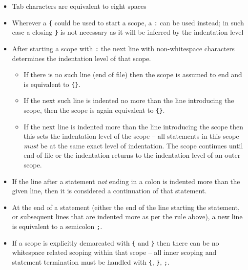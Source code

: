 \begin{itemize}
\item Tab characters are equivalent to eight spaces
\item Wherever a \verb!{! could be used to start a scope, a \verb!:! can be used instead; in such case a closing \verb!}! is not necessary as it will be inferred by the indentation level
\item After starting a scope with \verb!:! the next line with non-whitespace characters determines the indentation level of that scope.
\begin{itemize}
\item If there is no such line (end of file) then the scope is assumed to end and is equivalent to \verb!{}!.
\item If the next such line is indented no more than the line introducing the scope, then the scope is again equivalent to \verb!{}!.
\item If the next line is indented more than the line introducing the scope then this sets the indentation level of the scope -- all statements in this scope \emph{must} be at the same exact level of indentation. The scope continues until end of file or the indentation returns to the indentation level of an outer scope.
\end{itemize}
\item If the line after a statement \emph{not} ending in a colon is indented more than the given line, then it is considered a continuation of that statement.
\item At the end of a statement (either the end of the line starting the statement, or subsequent lines that are indented more as per the rule above), a new line is equivalent to a semicolon \verb!;!.
\item If a scope is explicitly demarcated with \verb!{! and \verb!}! then there can be no whitespace related scoping within that scope -- all inner scoping and statement termination must be handled with \verb!{!, \verb!}!, \verb!;!. 
\end{itemize}

